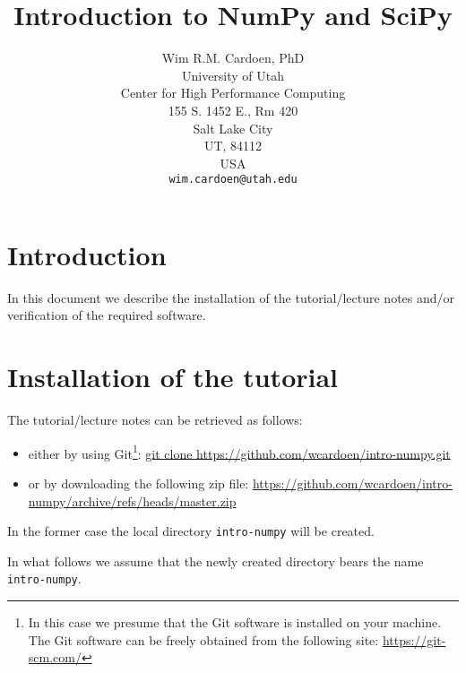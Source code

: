 \documentclass[11pt]{article}
\begin{document}
\title{Introduction to NumPy and SciPy}
\author{Wim R.M. Cardoen, PhD\\
        University of Utah\\
        Center for High Performance Computing\\
        155 S. 1452 E., Rm 420\\
        Salt Lake City\\
        UT, 84112\\
        USA\\
	\texttt{wim.cardoen@utah.edu}}
\renewcommand{\today}{Aug 22, 2024}
\renewcommand{\labelitemii}{$\star$}
\maketitle

\section*{Introduction}
In this document we describe the installation of the tutorial/lecture notes 
and/or verification of the required software.

\renewcommand \thesection{\Roman{section}}
\section{Installation of the tutorial}
The tutorial/lecture notes can be retrieved as follows:
\begin{itemize}
\item either by using Git\footnote{In this case we presume that the Git software is installed on your machine. 
	The Git software can be freely obtained from the following site: \href{https://git-scm.com/}{https://git-scm.com/}}:\newline
		\href{git clone https://github.com/wcardoen/intro-numpy.git}{git clone https://github.com/wcardoen/intro-numpy.git}
\item or by downloading the following zip file:\newline
	\href{https://github.com/wcardoen/intro-numpy/archive/refs/heads/master.zip}{https://github.com/wcardoen/intro-numpy/archive/refs/heads/master.zip}
\end{itemize}
In the former case the local directory \texttt{intro-numpy} 
will be created. 

In what follows we assume that the newly created directory bears the name \texttt{intro-numpy}.  
\end{document}
